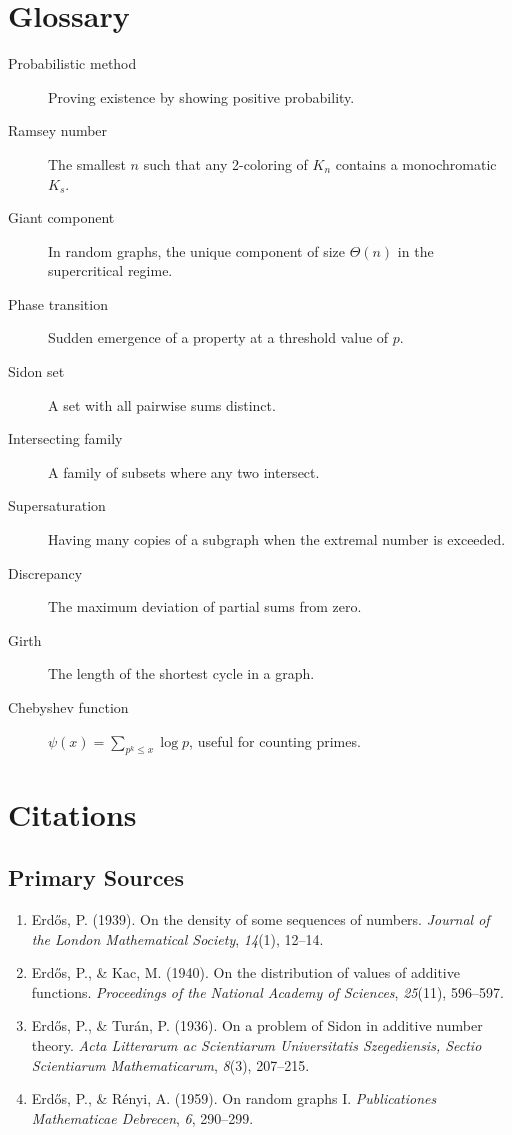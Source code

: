 \section*{Glossary}
\begin{description}
    \item[Probabilistic method] Proving existence by showing positive probability.
    \item[Ramsey number] The smallest $n$ such that any 2-coloring of $K_n$ contains a monochromatic $K_s$.
    \item[Giant component] In random graphs, the unique component of size $\Theta(n)$ in the supercritical regime.
    \item[Phase transition] Sudden emergence of a property at a threshold value of $p$.
    \item[Sidon set] A set with all pairwise sums distinct.
    \item[Intersecting family] A family of subsets where any two intersect.
    \item[Supersaturation] Having many copies of a subgraph when the extremal number is exceeded.
    \item[Discrepancy] The maximum deviation of partial sums from zero.
    \item[Girth] The length of the shortest cycle in a graph.
    \item[Chebyshev function] $\psi(x) = \sum_{p^k \leq x} \log p$, useful for counting primes.
\end{description}

\section{Citations}

\subsection*{Primary Sources}
\begin{enumerate}
    \item Erd\H{o}s, P. (1939). On the density of some sequences of numbers. \textit{Journal of the London Mathematical Society}, \textit{14}(1), 12--14.
    \item Erd\H{o}s, P., \& Kac, M. (1940). On the distribution of values of additive functions. \textit{Proceedings of the National Academy of Sciences}, \textit{25}(11), 596--597.
    \item Erd\H{o}s, P., \& Tur\'{a}n, P. (1936). On a problem of Sidon in additive number theory. \textit{Acta Litterarum ac Scientiarum Universitatis Szegediensis, Sectio Scientiarum Mathematicarum}, \textit{8}(3), 207--215.
    \item Erd\H{o}s, P., \& R\'{e}nyi, A. (1959). On random graphs I. \textit{Publicationes Mathematicae Debrecen}, \textit{6}, 290--299.
\end{enumerate}


